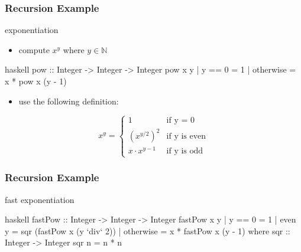 \documentclass[dvipsnames]{beamer}
\theoremstyle{plain}
\begin{document}
\begin{frame}[fragile]
  \frametitle{Recursion Example}

  \begin{exampleblock}{exponentiation}
    \begin{itemize}
      \item compute $x^y$ where $y \in \mathbb{N}$
    \end{itemize}

    \smallskip
    \begin{pygments}{haskell}
pow :: Integer -> Integer -> Integer
pow x y
  | y == 0    = 1
  | otherwise = x * pow x (y - 1)
    \end{pygments}

    \pause
    \begin{itemize}
      \item use the following definition:
    \end{itemize}
    \[
      x^y =
        \begin{cases}
          1               & \mbox{if y = 0}\\
          {(x^{y/2})}^2   & \mbox{if y is even}\\
          x \cdot x^{y-1} & \mbox{if y is odd}
        \end{cases}
    \]
  \end{exampleblock}
\end{frame}

\begin{frame}[fragile]
  \frametitle{Recursion Example}

  \begin{exampleblock}{fast exponentiation}
    \begin{pygments}{haskell}
fastPow :: Integer -> Integer -> Integer
fastPow x y
  | y == 0    = 1
  | even y    = sqr (fastPow x (y `div` 2))
  | otherwise = x * fastPow x (y - 1)
  where
    sqr :: Integer -> Integer
    sqr n = n * n
    \end{pygments}
  \end{exampleblock}
\end{frame}
\end{document}
